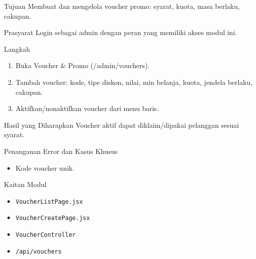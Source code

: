 
\begin{flowsection}{Tujuan}
Membuat dan mengelola voucher promo: syarat, kuota, masa berlaku, cakupan.
\end{flowsection}

\begin{flowsection}{Prasyarat}
Login sebagai admin dengan peran yang memiliki akses modul ini.
\end{flowsection}

\begin{flowsection}{Langkah}
\begin{enumerate}
  \item Buka Voucher \&  Promo (/admin/vouchers).
  \item Tambah voucher: kode, tipe diskon, nilai, min belanja, kuota, jendela berlaku, cakupan.
  \item Aktifkan/nonaktifkan voucher dari menu baris.
\end{enumerate}
\end{flowsection}


\begin{flowsection}{Hasil yang Diharapkan}
Voucher aktif dapat diklaim/dipakai pelanggan sesuai syarat.
\end{flowsection}

\begin{flowsection}{Penanganan Error dan Kasus Khusus}
\begin{itemize}
  \item Kode voucher unik.
\end{itemize}
\end{flowsection}

\begin{flowsection}{Kaitan Modul}
\begin{itemize}
  \item \texttt{VoucherListPage.jsx}
  \item \texttt{VoucherCreatePage.jsx}
  \item \texttt{VoucherController}
  \item \texttt{/api/vouchers}
\end{itemize}
\end{flowsection}

